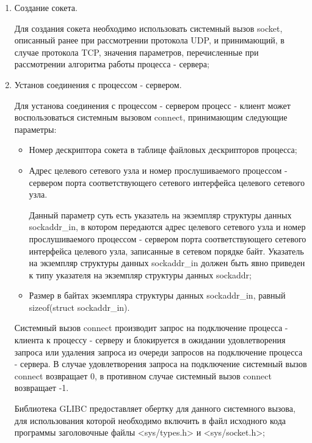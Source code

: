 	\begin{enumerate}

		\item Создание сокета.

			Для создания сокета необходимо использовать системный вызов socket, описанный ранее при рассмотрении протокола UDP, и принимающий,
			в случае протокола TCP, значения параметров, перечисленные при рассмотрении алгоритма работы процесса - сервера;

		\item Установ соединения с процессом - сервером.

			Для установа соединения с процессом - сервером процесс - клиент может воспользоваться системным вызовом connect, принимающим следующие параметры:

			\begin{itemize}

				\item Номер дескриптора сокета в таблице файловых дескрипторов процесса;
				\item Адрес целевого сетевого узла и номер прослушиваемого процессом - сервером порта соответствующего сетевого интерфейса целевого сетевого узла.

					Данный параметр суть есть указатель на экземпляр структуры данных sockaddr\_in, в котором передаются адрес целевого сетевого узла
					и номер прослушиваемого процессом - сервером порта соответствующего сетевого интерфейса целевого узла, записанные в сетевом порядке байт.
					Указатель на экземпляр структуры данных sockaddr\_in должен быть явно приведен к типу указателя на экземпляр структуры данных sockaddr;

				\item Размер в байтах экземпляра структуры данных sockaddr\_in, равный\\sizeof(struct sockaddr\_in).

			\end{itemize}

			Системный вызов connect производит запрос на подключение процесса - клиента к процессу - серверу и блокируется в ожидании удовлетворения
			запроса или удаления запроса из очереди запросов на подключение процесса - сервера. В случае удовлетворения запроса на подключение системный вызов
			connect возвращает 0, в противном случае системный вызов connect возвращает -1.

			Библиотека GLIBC предоставляет обертку для данного системного вызова, для использования которой необходимо включить в файл исходного кода программы
			заголовочные файлы <sys/types.h> и <sys/socket.h>;


\end{enumerate}
